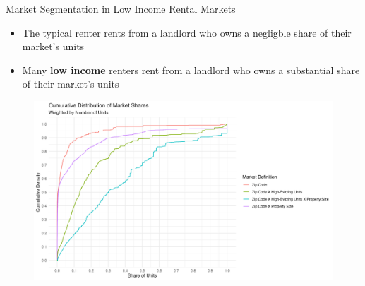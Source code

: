 \documentclass[10pt, xcolor=dvipsnames]{beamer}
\begin{document}
\begin{frame}{Market Segmentation in Low Income Rental Markets}
    \begin{itemize}
        \item The typical renter rents from a landlord who owns a negligble share of their market's units
        \item Many \textbf{low income} renters rent from a landlord who owns a substantial share of their market's units
    \end{itemize}
    \begin{figure}
        \centering
        \includegraphics[width=0.75\linewidth]{figs/market_share_cdf.png}
        \label{fig:market-share-cdf}
    \end{figure}
\end{frame}

    



\end{document}
